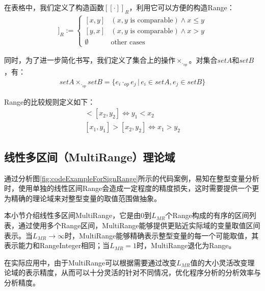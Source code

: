 在表格中，我们定义了构造函数$ [[\cdot]]_R $，利用它可以方便的构造Range：
\begin{align}
[[x, y]]_R := \begin{cases}
[x, y] & (x, y \text{ is comparable}) \land x \le y\\
[y, x] & (x, y \text{ is comparable}) \land x > y\\
\emptyset & \text{other cases}
\end{cases}
\end{align}

同时，为了进一步简化书写，我们定义了集合上的操作$ \times_{\cdot_{op}} $。对集合$ setA $和$ setB $，有：
\begin{align}
setA  \times_{\cdot_{op}} setB =  \{ e_i \cdot_{op} e_j \, | \, e_i \in setA, e_j \in setB \} 
\end{align}

Range的比较规则定义如下：
\begin{align}
	[x_1, y_1] < [x_2, y_2] \iff y_1 < x_2\\
	[x_1, y_1] > [x_2, y_2] \iff x_1 > y_2
\end{align}

\subsection{线性多区间（MultiRange）理论域}
\label{sec:MultiRange}

通过分析图\ref{fig:codeExampleForSignRange}所示的代码案例，易知在整型变量分析时，使用单独的线性区间Range会造成一定程度的精度损失，这时需要提供一个更为精确的理论域来对整型变量的取值范围做抽象。

本小节介绍线性多区间MultiRange，它是由0到$ L_{MR} $个Range构成的有序的区间列表，通过使用多个Range区间，MultiRange能够提供更贴近实际域的变量取值区间表示。当$ L_{MR}  \rightarrow \infty $时，MultiRange能够精确表示整型变量的每一个可能取值，其表示能力和RangeInteger相同；当$ L_{MR} = 1 $时，MultiRange退化为Range。

在实际应用中，由于MultiRange可以根据需要通过改变$ L_{MR} $值的大小灵活改变理论域的表示精度，从而可以十分灵活的针对不同情况，优化程序分析的分析效率与分析精度。


